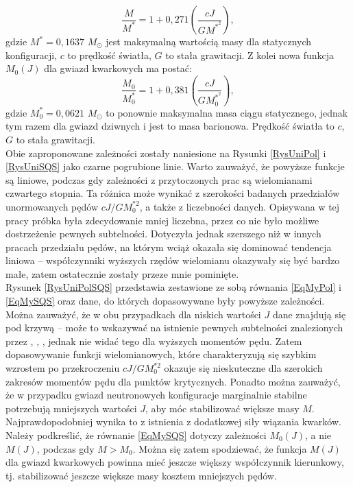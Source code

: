 \documentclass{bachelor_thesis}
\begin{document}
            \begin{equation}
                \frac{M}{M^*}=1+0,271\left(\frac{cJ}{GM^{*^2}}\right),
                \label{EqMyPol}
            \end{equation}
            gdzie $M^*=0,1637$ $M_\odot$ jest maksymalną wartością masy dla statycznych konfiguracji, $c$ to prędkość światła, $G$ to stała grawitacji. Z kolei nowa funkcja $M_0(J)$ dla gwiazd kwarkowych ma postać:
            \begin{equation}
                \frac{M_0}{M_0^*}=1+0,381\left(\frac{cJ}{GM_0^{*^2}}\right),
                \label{EqMySQS}
            \end{equation}
            gdzie $M_0^*=0,0621$ $M_\odot$ to ponownie maksymalna masa ciągu statycznego, jednak tym razem dla gwiazd dziwnych i jest to masa barionowa. Prędkość światła to $c$, $G$ to stała grawitacji.\\
            \indent Obie zaproponowane zależności zostały naniesione na Rysunki \ref{RysUniPol} i \ref{RysUniSQS} jako czarne pogrubione linie. Warto zauważyć, że powyższe funkcje są liniowe, podczas gdy zależności z przytoczonych prac są wielomianami czwartego stopnia. Ta różnica może wynikać z szerokości badanych przedziałów unormowanych pędów $cJ/GM_0^{*2}$, a także z liczebności danych. Opisywana w tej pracy próbka była zdecydowanie mniej liczebna, przez co nie było możliwe dostrzeżenie pewnych subtelności. Dotyczyła jednak szerszego niż w innych pracach przedziału pędów, na którym wciąż okazała się dominować tendencja liniowa -- współczynniki wyższych rzędów wielomianu okazywały się być bardzo małe, zatem ostatecznie zostały przeze mnie pominięte.\\
            \indent Rysunek \ref{RysUniPolSQS} przedstawia zestawione ze sobą równania \ref{EqMyPol} i \ref{EqMySQS} oraz dane, do których dopasowywane były powyższe zależności. Można zauważyć, że w obu przypadkach dla niskich wartości $J$ dane znajdują się pod krzywą -- może to wskazywać na istnienie pewnych subtelności znalezionych przez \cite{Breu2016}, \cite{Bozzola2018}, \cite{Weih2018}, jednak nie widać tego dla wyższych momentów pędu. Zatem dopasowywanie funkcji wielomianowych, które charakteryzują się szybkim wzrostem po przekroczeniu $cJ/GM_0^{*2}$ okazuje się nieskuteczne dla szerokich zakresów momentów pędu dla punktów krytycznych. Ponadto można zauważyć, że w przypadku gwiazd neutronowych konfiguracje marginalnie stabilne potrzebują mniejszych wartości $J$, aby móc stabilizować większe masy $M$. Najprawdopodobniej wynika to z istnienia z dodatkowej siły wiązania kwarków. Należy podkreślić, że równanie \ref{EqMySQS} dotyczy zależności $M_0(J)$, a nie $M(J)$, podczas gdy $M>M_0$. Można się zatem spodziewać, że funkcja $M(J)$ dla gwiazd kwarkowych powinna mieć jeszcze większy współczynnik kierunkowy, tj. stabilizować jeszcze większe masy kosztem mniejszych pędów.
\end{document}
